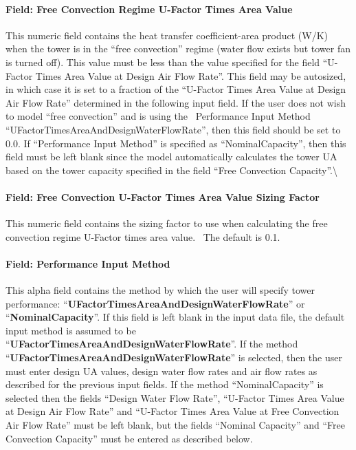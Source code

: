 \paragraph{Field: Free Convection Regime U-Factor Times Area Value}\label{fieldfree-convection-regime-u-factor-times-area-value}

This numeric field contains the heat transfer coefficient-area product (W/K) when the tower is in the ``free convection'' regime (water flow exists but tower fan is turned off). This value must be less than the value specified for the field ``U-Factor Times Area Value at Design Air Flow Rate''. This field may be autosized, in which case it is set to a fraction of the ``U-Factor Times Area Value at Design Air Flow Rate'' determined in the following input field. If the user does not wish to model ``free convection'' and is using the~ Performance Input Method ``UFactorTimesAreaAndDesignWaterFlowRate'', then this field should be set to 0.0. If ``Performance Input Method'' is specified as ``NominalCapacity'', then this field must be left blank since the model automatically calculates the tower UA based on the tower capacity specified in the field ``Free Convection Capacity''.\textbackslash{}

\paragraph{Field: Free Convection U-Factor Times Area Value Sizing Factor}\label{field-free-convection-u-factor-times-area-value-sizing-factor}

This numeric field contains the sizing factor to use when calculating the free convection regime U-Factor times area value.~ The default is 0.1.

\paragraph{Field: Performance Input Method}\label{field-performance-input-method}

This alpha field contains the method by which the user will specify tower performance: ``\textbf{UFactorTimesAreaAndDesignWaterFlowRate}'' or ``\textbf{NominalCapacity}''. If this field is left blank in the input data file, the default input method is assumed to be ``\textbf{UFactorTimesAreaAndDesignWaterFlowRate}''. If the method ``\textbf{UFactorTimesAreaAndDesignWaterFlowRate}'' is selected, then the user must enter design UA values, design water flow rates and air flow rates as described for the previous input fields. If the method ``NominalCapacity'' is selected then the fields ``Design Water Flow Rate'', ``U-Factor Times Area Value at Design Air Flow Rate'' and ``U-Factor Times Area Value at Free Convection Air Flow Rate'' must be left blank, but the fields ``Nominal Capacity'' and ``Free Convection Capacity'' must be entered as described below.


